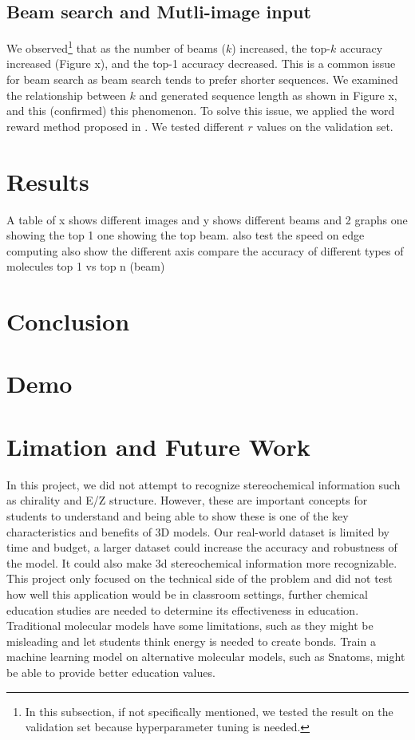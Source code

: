 \documentclass{article}
\begin{document}
\subsection{Beam search and Mutli-image input}


We observed\footnote{In this subsection, if not specifically mentioned, we tested the result on the validation set because hyperparameter tuning is needed.} that as the number of beams ($k$) increased, the top-$k$ accuracy increased (Figure x), and the top-1 accuracy decreased. This is a common issue for beam search as beam search tends to prefer shorter sequences. \autocite{yang_breaking_2018} We examined the relationship between $k$ and generated sequence length as shown in Figure x, and this (confirmed) this phenomenon. To solve this issue, we applied the word reward method proposed in \autocite{he_improved_2016}. We tested different $r$ values on the validation set. 
\section{Results}
A table of x shows different images and y shows different beams and 2 graphs one showing the top 1 one showing the top beam.  
also test the speed on edge computing also show the different axis
compare the accuracy of different types of molecules
top 1 vs top n (beam)
\section{Conclusion}
\section{Demo}
\section{Limation and Future Work}
In this project, we did not attempt to recognize stereochemical information such as chirality and E/Z structure. However, these are important concepts for students to understand and being able to show these is one of the key characteristics and benefits of 3D models. 
Our real-world dataset is limited by time and budget, a larger dataset could increase the accuracy and robustness of the model. It could also make 3d stereochemical information more recognizable.
This project only focused on the technical side of the problem and did not test how well this application would be in classroom settings, further chemical education studies are needed to determine its effectiveness in education. 
Traditional molecular models have some limitations, such as they might be misleading and let students think energy is needed to create bonds\autocite{snatoms}. Train a machine learning model on alternative molecular models, such as Snatoms\autocite{snatoms}, might be able to provide better education values.
\end{document}
